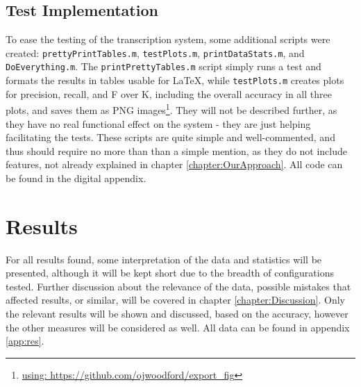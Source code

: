 	\subsection{Test Implementation}		%
		To ease the testing of the transcription system, some additional scripts were created: \texttt{prettyPrintTables.m}, \texttt{testPlots.m}, \texttt{printDataStats.m}, and \texttt{DoEverything.m}.
		The \texttt{printPrettyTables.m} script simply runs a test and formats the results in tables usable for \LaTeX, while \texttt{testPlots.m} creates plots for precision, recall, and F over K, including the overall accuracy in all three plots, and saves them as PNG images\footnote{\url{using: https://github.com/ojwoodford/export\_fig}}. They will not be described further, as they have no real functional effect on the system -  they are just helping facilitating the tests. These scripts are quite simple and well-commented, and thus should require no more than than a simple mention, as they do not include features, not already explained in chapter \ref{chapter:OurApproach}.
		All code can be found in the digital appendix.
			
 
\section{Results}
	
	For all results found, some interpretation of the data and statistics will be presented, although it will be kept short due to the breadth of configurations tested. Further discussion about the relevance of the data, possible mistakes that affected results, or similar, will be covered in chapter \ref{chapter:Discussion}. Only the relevant results will be shown and discussed, based on the accuracy, however the other measures will be considered as well. All data can be found in appendix \ref{app:res}. 

	
